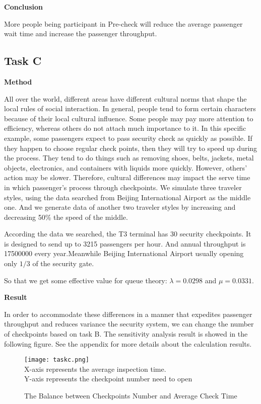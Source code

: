 \documentclass{mcmthesis}
\begin{document}
\par \textbf{Conclusion}
\par More people being participant in Pre-check will reduce the average passenger wait time and increase the passenger throughput.




\subsection{Task C}
\textbf{Method}
\par All over the world, different areas have different cultural norms that shape the local rules of social interaction. In general, people tend to form certain characters because of their local cultural influence. Some people may pay more attention to efficiency, whereas others do not attach much importance to it. In this specific example, some passengers expect to pass security check as quickly as possible. If they happen to choose regular check points, then they will try to speed up during the process. They tend to do things such as removing shoes, belts, jackets, metal objects, electronics, and containers with liquids more quickly. However, others’ action may be slower. Therefore, cultural differences may impact the serve time in which passenger’s process through checkpoints. We simulate three traveler styles, using the data searched from Beijing International Airport as the middle one. And we generate data of another two traveler styles by increasing and decreasing 50\% the speed of the middle. 
\par According the data we searched, the T3 terminal has 30 security checkpoints. It is designed to send up to 3215 passengers per hour. And annual throughput is 17500000 every year.Meanwhile Beijing International Airport usually opening only $1/3$ of the security gate.
\par So that we get some effective value for queue theory: $\lambda = 0.0298$ and $\mu = 0.0331$.
\par \textbf{Result}
\par In order to accommodate these differences in a manner that expedites passenger throughput and reduces variance the security system, we can change the number of checkpoints based on task B. The sensitivity analysis result is showed in the following figure. See the appendix for more details about the calculation results.
\begin{figure}[h]
\small
\centering
\texttt{[image: taskc.png]}\\
X-axis represents the average inspection time.\\
Y-axis represents the checkpoint number need to open\\
\caption{The Balance between Checkpoints Number and Average Check Time} \label{fig:The Balance between Checkpoints Number and Average Check Time}
\end{figure}
\end{document}
